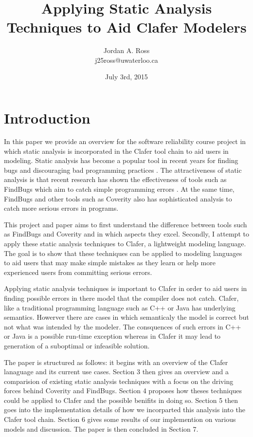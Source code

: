 \documentclass[10pt,oneside]{IEEEtran}
\title{Applying Static Analysis Techniques to Aid Clafer Modelers}
\author{Jordan A. Ross \\j25ross@uwaterloo.ca}
\date{July 3rd, 2015}
\begin{document}
\maketitle
\newpage

\section{Introduction}
In this paper we provide an overview for the software reliability course project in which static analysis
is incorporated in the Clafer tool chain to aid users in modeling. Static analysis has become a popular
tool in recent years for finding bugs and discouraging bad programming practices \cite{8}.
The attractiveness of static analysis is that recent research has shown the effectiveness of tools
such as FindBugs which aim to catch simple programming errors \cite{6}. At the same time, FindBugs
and other tools such as Coverity also has sophisticated analysis to catch more serious errors in programs.

This project and paper aims to first understand the difference between tools such as FindBugs and Coverity
and in which aspects they excel. Secondly, I attempt to apply these static analysis techniques to Clafer, a
lightweight modeling language. The goal is to show that these techniques can be applied to modeling languages
to aid users that may make simple mistakes as they learn or help more experienced users from committing serious
errors.

Applying static analysis techniques is important to Clafer in order to aid users in finding possible errors in there model that the compiler does not catch. Clafer, like a traditional programming language such as C++ or Java has underlying semantics. Howerver there are cases in which semanticaly the model is correct but not what was intended by the modeler. The consquences of such errors in C++ or Java is a possible run-time exception whereas in Clafer it may lead to generation of a suboptimal or infeasible solution.

The paper is structured as follows: it begins with an overview of the Clafer lanaguage and its current use
cases. Section 3 then gives an overview and a comparision of existing static analysis techniques with a focus
on the driving forces behind Coverity and FindBugs. Section 4 proposes how theses techniques could be applied
to Clafer and the possible benifits in doing so. Section 5 then goes into the implementation details of how
we incorparted this analysis into the Clafer tool chain. Section 6 gives some results of our implemention on
various models and discussion. The paper is then concluded in Section 7.
\end{document}
